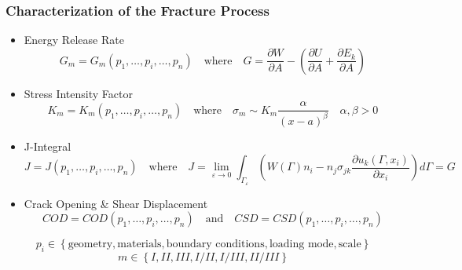 \documentclass[first,firstsupp,lastsupp,last,hyperref,table]{ETHclass}
\begin{document}
\begin{frame}
\frametitle{\small Characterization of the Fracture Process}
\vspace{-0.25cm}
\centering
\scriptsize
\begin{itemize}[label=]
\item Energy Release Rate
\begin{equation*}
G_{m}=G_{m}\left(p_{1},\dots,p_{i},\dots,p_{n}\right)\quad\text{where}\quad G=\frac{\partial W}{\partial A} - \left(\frac{\partial U}{\partial A}+\frac{\partial E_{k}}{\partial A}\right)
\end{equation*}
\item Stress Intensity Factor
\begin{equation*}
K_{m}=K_{m}\left(p_{1},\dots,p_{i},\dots,p_{n}\right)\quad\text{where}\quad \sigma_{m}\sim K_{m}\frac{\alpha}{\left(x-a\right)^{\beta}}\quad\alpha,\beta>0
\end{equation*}
\item J-Integral
\begin{equation*}
J=J\left(p_{1},\dots,p_{i},\dots,p_{n}\right)\quad\text{where}\quad J=\lim_{\varepsilon\to 0}\int_{\Gamma_{\varepsilon}}\left(W\left(\Gamma\right)n_{i}-n_{j}\sigma_{jk}\frac{\partial u_{k}\left(\Gamma,x_{i}\right)}{\partial x_{i}}\right)d\Gamma = G
\end{equation*}
\item Crack Opening \& Shear Displacement
\begin{equation*}
COD=COD\left(p_{1},\dots,p_{i},\dots,p_{n}\right)\quad\text{and}\quad CSD=CSD\left(p_{1},\dots,p_{i},\dots,p_{n}\right)
\end{equation*}
\end{itemize}
\vspace{5pt}
\begin{equation*}
p_{i}\in\left\{\text{geometry},\text{materials},\text{boundary conditions},\text{loading mode},\text{scale}\right\}
\end{equation*}
\begin{equation*}
m\in\left\{I,II,III,I/II,I/III,II/III\right\}
\end{equation*}
\end{frame}
\end{document}

